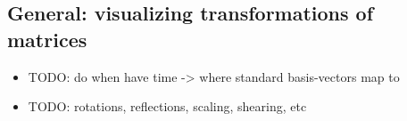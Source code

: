 \subsection*{General: visualizing transformations of
matrices}

\begin{itemize}

\item
  TODO: do when have time -\textgreater{} where standard basis-vectors
  map to
\item
  TODO: rotations, reflections, scaling, shearing, etc
\end{itemize}